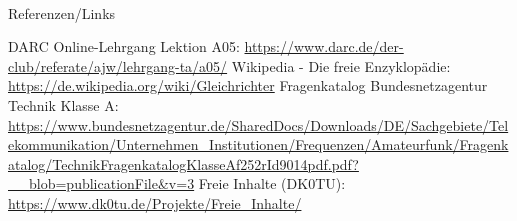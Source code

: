 \hypertarget{refs}{}
\textcolor{white}{} \\ %
\Large Referenzen/Links
\footnotesize

\begin{thebibliography}{}
    DARC Online-Lehrgang Lektion A05:
    \url{https://www.darc.de/der-club/referate/ajw/lehrgang-ta/a05/}
      Wikipedia - Die freie Enzyklopädie:
    \url{https://de.wikipedia.org/wiki/Gleichrichter}
     Fragenkatalog Bundesnetzagentur Technik Klasse A:
    \url{https://www.bundesnetzagentur.de/SharedDocs/Downloads/DE/Sachgebiete/Telekommunikation/Unternehmen_Institutionen/Frequenzen/Amateurfunk/Fragenkatalog/TechnikFragenkatalogKlasseAf252rId9014pdf.pdf?__blob=publicationFile&v=3}
      Freie Inhalte (DK0TU):
    \url{https://www.dk0tu.de/Projekte/Freie_Inhalte/}
\end{thebibliography}


